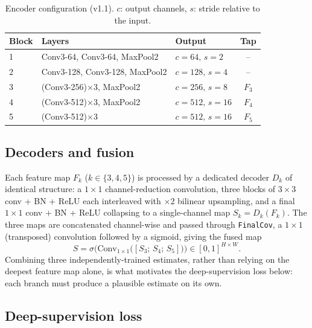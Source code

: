 \begin{table}[t]
\centering
\caption{Encoder configuration (v1.1). $c$: output channels, $s$: stride relative to the input.}
\label{tab:encoder}
\begin{tabular}{@{}lllc@{}}
\toprule
\textbf{Block} & \textbf{Layers} & \textbf{Output} & \textbf{Tap} \\
\midrule
1 & Conv3-64, Conv3-64, MaxPool2 & $c{=}64,\,s{=}2$ & -- \\
2 & Conv3-128, Conv3-128, MaxPool2 & $c{=}128,\,s{=}4$ & -- \\
3 & (Conv3-256)$\times3$, MaxPool2 & $c{=}256,\,s{=}8$ & $F_3$ \\
4 & (Conv3-512)$\times3$, MaxPool2 & $c{=}512,\,s{=}16$ & $F_4$ \\
5 & (Conv3-512)$\times3$ & $c{=}512,\,s{=}16$ & $F_5$ \\
\bottomrule
\end{tabular}
\end{table}

\subsection{Decoders and fusion}
\label{subsec:decoder11}

Each feature map $F_k$ ($k\in\{3,4,5\}$) is processed by a dedicated decoder $D_k$ of identical structure: a $1{\times}1$ channel-reduction convolution, three blocks of $3{\times}3$ conv + BN + ReLU each interleaved with $\times2$ bilinear upsampling, and a final $1{\times}1$ conv + BN + ReLU collapsing to a single-channel map $S_k = D_k(F_k)$. The three maps are concatenated channel-wise and passed through \texttt{FinalCov}, a $1{\times}1$ (transposed) convolution followed by a sigmoid, giving the fused map
\begin{equation}
\label{eq:fuse}
S = \sigma\big(\mathrm{Conv}_{1\times1}\big([S_3;\,S_4;\,S_5]\big)\big) \in [0,1]^{H\times W}.
\end{equation}
Combining three independently-trained estimates, rather than relying on the deepest feature map alone, is what motivates the deep-supervision loss below: each branch must produce a plausible estimate on its own.

\subsection{Deep-supervision loss}
\label{subsec:loss11}

